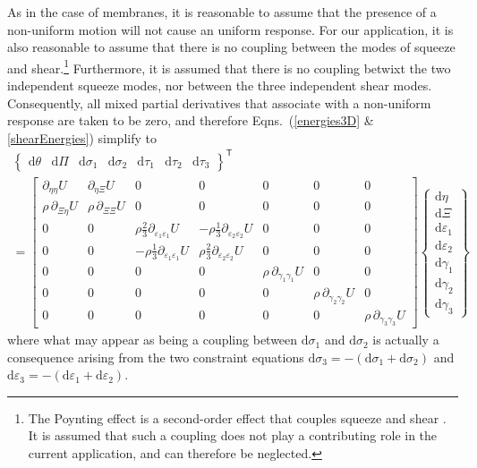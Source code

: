 As in the case of membranes, it is reasonable to assume that the presence of a non-uniform motion will not cause an uniform response.  For our application, it is also reasonable to assume that there is no coupling between the modes of squeeze and shear.\footnote{
   The Poynting effect is a second-order effect that couples squeeze and shear \cite{FreedZamani19}.  It is assumed that such a coupling does not play a contributing role in the current application, and can therefore be neglected.
}
Furthermore, it is assumed that there is no coupling betwixt the two independent squeeze modes, nor between the three independent shear modes.  Consequently, all mixed partial derivatives that associate with a non-uniform response are taken to be zero, and therefore Eqns.~(\ref{energies3D} \& \ref{shearEnergies}) simplify to
\footnotesize
\begin{multline*}
\left\{ \begin{matrix}
\mathrm{d} \theta & \mathrm{d} \Pi &
\mathrm{d} \sigma_1 & \mathrm{d} \sigma_2 &
\mathrm{d} \tau_1 & \mathrm{d} \tau_2 & \mathrm{d} \tau_3
\end{matrix} \right\}^{\mathsf{T}} \\ = \begin{bmatrix}
\partial_{\eta\eta} U & \partial_{\eta\Xi} U & 0 & 0 & 0 & 0 & 0 \\
\rho \, \partial_{\Xi\eta} U & \rho \, \partial_{\Xi\Xi} U & 0 & 0 & 0 & 0 & 0 \\
0 & 0 & \rho \tfrac{2}{3} \partial_{\varepsilon_1 \varepsilon_1} U & -\rho \tfrac{1}{3} \partial_{\varepsilon_2 \varepsilon_2} U & 0 & 0 & 0 \\
0 & 0 & -\rho \tfrac{1}{3} \partial_{\varepsilon_1 \varepsilon_1} U & \rho \tfrac{2}{3} \partial_{\varepsilon_2 \varepsilon_2} U & 0 & 0 & 0 \\
0 & 0 & 0 & 0 & \rho \, \partial_{\gamma_1\gamma_1} U & 0 & 0 \\
0 & 0 & 0 & 0 & 0 & \rho \, \partial_{\gamma_2\gamma_2} U & 0 \\
0 & 0 & 0 & 0 & 0 & 0 & \rho \, \partial_{\gamma_3\gamma_3} U
\end{bmatrix}
\left\{ \begin{matrix}
\mathrm{d}\eta \\ \mathrm{d} \Xi \\
\mathrm{d} \varepsilon_1 \\ \mathrm{d} \varepsilon_2 \\
\mathrm{d} \gamma_1 \\ \mathrm{d} \gamma_2 \\ \mathrm{d} \gamma_3
\end{matrix} \right\}
\end{multline*}
\normalsize
where what may appear as being a coupling between $\mathrm{d} \sigma_1$ and $\mathrm{d} \sigma_2$ is actually a consequence arising from the two constraint equations $\mathrm{d} \sigma_3 = -( \mathrm{d} \sigma_1 + \mathrm{d} \sigma_2 )$ and $\mathrm{d} \varepsilon_3 = -( \mathrm{d} \varepsilon_1 + \mathrm{d} \varepsilon_2 )$.

